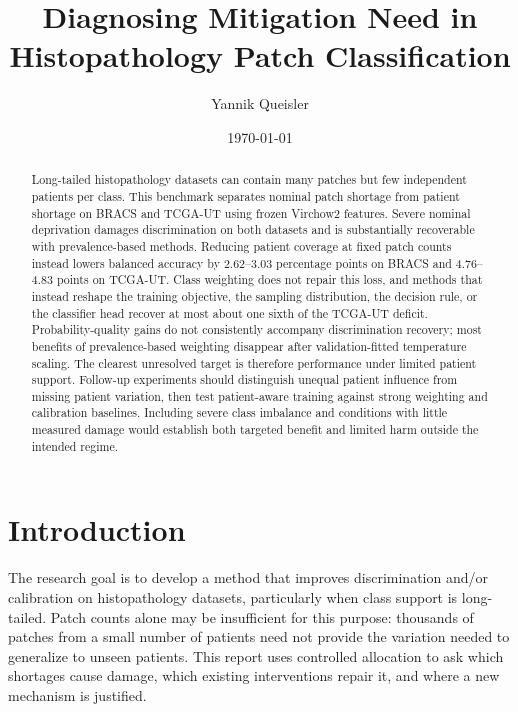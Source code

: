 \documentclass[11pt]{article}
\title{Diagnosing Mitigation Need in Histopathology Patch Classification}
\author{Yannik Queisler}
\date{\today}
\begin{document}
\raggedbottom
\setlength{\emergencystretch}{2em}
\hypersetup{pageanchor=false}
\begin{titlepage}
\centering
\vspace*{\fill}
\makeatletter
{\LARGE\bfseries \@title\par}
\vspace{1.5em}
{\large \@author\par}
\vspace{1.5em}
{\large \@date\par}
\makeatother

\begin{abstract}
\begingroup
\setlength{\emergencystretch}{2em}
\noindent Long-tailed histopathology datasets can contain many patches but few independent patients per class. This benchmark separates nominal patch shortage from patient shortage on BRACS and TCGA-UT using frozen Virchow2 features. Severe nominal deprivation damages discrimination on both datasets and is substantially recoverable with prevalence-based methods. Reducing patient coverage at fixed patch counts instead lowers balanced accuracy by \num{2.62}--\num{3.03} percentage points on BRACS and \num{4.76}--\num{4.83} points on TCGA-UT. Class weighting does not repair this loss, and methods that instead reshape the training objective, the sampling distribution, the decision rule, or the classifier head recover at most about one sixth of the TCGA-UT deficit. Probability-quality gains do not consistently accompany discrimination recovery; most benefits of prevalence-based weighting disappear after validation-fitted temperature scaling. The clearest unresolved target is therefore performance under limited patient support. Follow-up experiments should distinguish unequal patient influence from missing patient variation, then test patient-aware training against strong weighting and calibration baselines. Including severe class imbalance and conditions with little measured damage would establish both targeted benefit and limited harm outside the intended regime.
\par
\endgroup
\end{abstract}
\vspace*{\fill}
\end{titlepage}
\hypersetup{pageanchor=true}

\setcounter{tocdepth}{2}
\tableofcontents

\clearpage

\section{Introduction}
\label{sec:intro}
The research goal is to develop a method that improves discrimination and/or calibration on histopathology datasets, particularly when class support is long-tailed. Patch counts alone may be insufficient for this purpose: thousands of patches from a small number of patients need not provide the variation needed to generalize to unseen patients. This report uses controlled allocation to ask which shortages cause damage, which existing interventions repair it, and where a new mechanism is justified.
\end{document}
